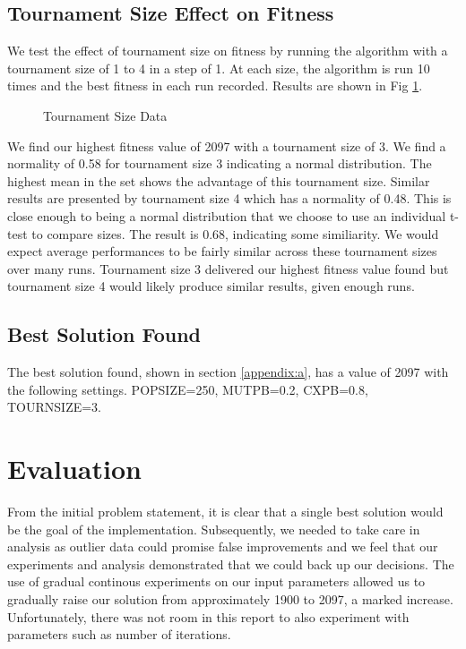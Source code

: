 \documentclass[11pt,a4paper]{article}
\begin{document}
\subsection{Tournament Size Effect on Fitness}
We test the effect of tournament size on fitness by running the algorithm with a tournament size of 1 to 4 in a step of 1. At each size, the algorithm is run 10 times and the best fitness in each run recorded. Results are shown in Fig \ref{fig:TournamentSizeFit}.
\begin{figure}
\centering
{}
\qquad
{}
\caption{Tournament Size Data}
\label{fig:TournamentSizeFit}
\end{figure}

We find our highest fitness value of 2097 with a tournament size of 3. We find a normality of 0.58 for tournament size 3 indicating a normal distribution. The highest mean in the set shows the advantage of this tournament size. Similar results are presented by tournament size 4 which has a normality of 0.48. This is close enough to being a normal distribution that we choose to use an individual t-test to compare sizes. The result is 0.68, indicating some similiarity. We would expect average performances to be fairly similar across these tournament sizes over many runs.
Tournament size 3 delivered our highest fitness value found but tournament size 4 would likely produce similar results, given enough runs.

\subsection{Best Solution Found}
The best solution found, shown in section \ref{appendix:a}, has a value of 2097 with the following settings. POPSIZE=250, MUTPB=0.2, CXPB=0.8, TOURNSIZE=3.

\section{Evaluation}
From the initial problem statement, it is clear that a single best solution would be the goal of the implementation. Subsequently, we needed to take care in analysis as outlier data could promise false improvements and we feel that our experiments and analysis demonstrated that we could back up our decisions. The use of gradual continous experiments on our input parameters allowed us to gradually raise our solution from approximately 1900 to 2097, a marked increase. Unfortunately, there was not room in this report to also experiment with parameters such as number of iterations.
\end{document}
